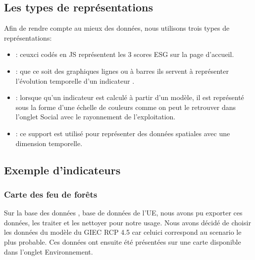\documentclass[letterpaper,10pt,french]{sphinxmanual}
\begin{document}
\subsection{Les types de représentations}
\label{\detokenize{indicateurs:les-types-de-representations}}
\sphinxAtStartPar
Afin de rendre compte au mieux des données, nous utilisons trois types de représentations:
\begin{itemize}
\item {} 
\sphinxAtStartPar
{}: ceux\sphinxhyphen{}ci codés en JS représentent les 3 scores ESG sur la page d’accueil.

\item {} 
\sphinxAtStartPar
{}: que ce soit des graphiques lignes ou à barres ils servent à représenter l’évolution temporelle d’un indicateur .

\item {} 
\sphinxAtStartPar
{}: lorsque qu’un indicateur est calculé à partir d’un modèle, il est représenté sous la forme d’une échelle de couleurs comme on peut le retrouver dans l’onglet Social avec le rayonnement de l’exploitation.

\item {} 
\sphinxAtStartPar
{}: ce support est utilisé pour représenter des données spatiales avec une dimension temporelle.

\end{itemize}


\subsection{Exemple d’indicateurs}
\label{\detokenize{indicateurs:exemple-d-indicateurs}}

\subsubsection{Carte des feu de forêts}
\label{\detokenize{indicateurs:carte-des-feu-de-forets}}
\sphinxAtStartPar
Sur la base des données , base de données de l’UE, nous avons pu exporter ces données, les traiter et les nettoyer pour notre usage. Nous avons décidé de choisir les données du modèle du GIEC RCP 4.5 car celui\sphinxhyphen{}ci correspond au scenario le plus probable.
Ces données ont ensuite été présentées sur une carte disponible dans l’onglet Environnement.
\end{document}
